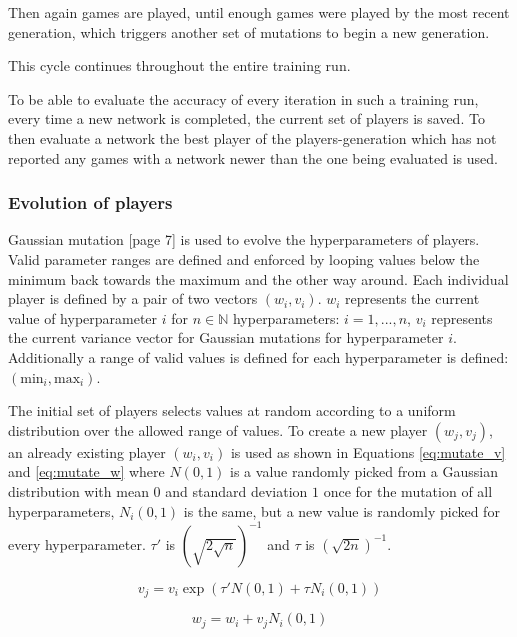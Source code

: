 \documentclass[12pt,onecolumn,oneside,titlepage]{article}
\begin{document}
Then again games are played, until enough games were played by the most recent generation, which triggers another set of mutations to begin a new generation.

This cycle continues throughout the entire training run.

To be able to evaluate the accuracy of every iteration in such a training run, every time a new network is completed, the current set of players is saved. 
To then evaluate a network the best player of the players-generation which has not reported any games with a network newer than the one being evaluated is used.

\subsubsection{Evolution of players}

Gaussian mutation \cite{yao1999evolving}[page 7] is used to evolve the hyperparameters of players. Valid parameter ranges are defined and enforced by looping values below the minimum back towards the maximum and the other way around.
Each individual player is defined by a pair of two vectors $(w_i, v_i)$. $w_i$ represents the current value of hyperparameter $i$ for $n \in \mathbb{N}$ hyperparameters: $i = 1, ..., n$, $v_i$ represents the current variance vector for Gaussian mutations for hyperparameter $i$.
Additionally a range of valid values is defined for each hyperparameter is defined: $(\text{min}_i, \text{max}_i)$.

The initial set of players selects values at random according to a uniform distribution over the allowed range of values.
To create a new player $(w_j, v_j)$, an already existing player $(w_i, v_i)$ is used as shown in Equations \ref{eq:mutate_v} and \ref{eq:mutate_w} where $N(0,1)$ is a value randomly picked from a Gaussian distribution with mean $0$ and standard deviation $1$
once for the mutation of all hyperparameters,
$N_i(0,1)$ is the same, but a new value is randomly picked for every hyperparameter. $\tau'$ is $(\sqrt{2\sqrt{n}})^{-1}$ and $\tau$ is $(\sqrt{2n})^{-1}$.

\begin{equation}
 v_j = v_i \exp (\tau'N(0,1) + \tau N_i(0, 1))\label{eq:mutate_v}
\end{equation}

\begin{equation}
 w_j = w_i + v_j N_i(0, 1)\label{eq:mutate_w}
\end{equation}
\end{document}
